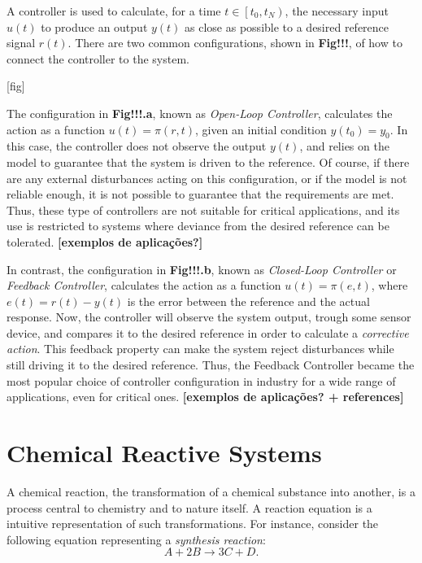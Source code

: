 \documentclass[a4paper,11pt]{book}
\numberwithin{figure}{chapter}
\numberwithin{equation}{chapter}
\numberwithin{table}{chapter}
\theoremstyle{definition}
\begin{document}
A controller is used to calculate, for a time $t \in \left[ t_0, t_N\right)$, the necessary input $u(t)$ to produce an output $y(t)$ as close as possible to a desired reference signal $r(t)$. There are two common configurations, shown in \textbf{Fig!!!}, of how to connect the controller to the system.

[fig]

The configuration in \textbf{Fig!!!.a}, known as \textit{Open-Loop Controller}, calculates the action as a function $u(t) = \pi(r, t)$, given an initial condition $y(t_0) = y_0$. In this case, the controller does not observe the output $y(t)$, and relies on the model to guarantee that the system is driven to the reference. Of course, if there are any external disturbances acting on this configuration, or if the model is not reliable enough, it is not possible to guarantee that the requirements are met. Thus, these type of controllers are not suitable for critical applications, and its use is restricted to systems where deviance from the desired reference can be tolerated. \textbf{[exemplos de aplicações?]}

In contrast, the configuration in \textbf{Fig!!!.b}, known as \textit{Closed-Loop Controller} or \textit{Feedback Controller}, calculates the action as a function $u(t) = \pi(e, t)$, where $e(t) = r(t) - y(t)$ is the error between the reference and the actual response. Now, the controller will observe the system output, trough some sensor device, and compares it to the desired reference in order to calculate a \textit{corrective action}. This feedback property can make the system reject disturbances while still driving it to the desired reference. Thus, the Feedback Controller became the most popular choice of controller configuration in industry for a wide range of applications, even for critical ones.  \textbf{[exemplos de aplicações? + references]}

\section{Chemical Reactive Systems}

A chemical reaction, the transformation of a chemical substance into another, is a process central to chemistry and to nature itself. A reaction equation is a intuitive representation of such transformations. For instance, consider the following equation representing a \textit{synthesis reaction}:
\begin{equation}
    A + 2 B \longrightarrow 3 C + D 
.\end{equation} 
\end{document}
